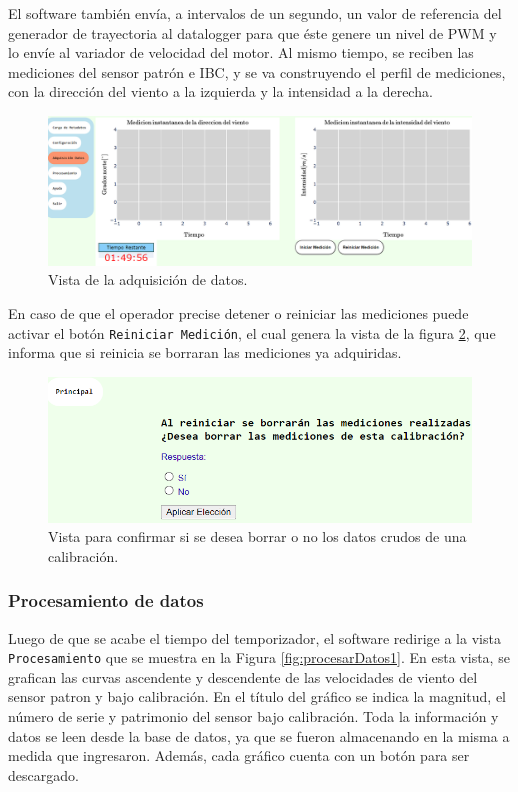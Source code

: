El software también envía, a intervalos de un segundo, un valor de referencia del generador de trayectoria al datalogger para que éste genere un nivel de PWM y lo envíe al variador de velocidad del motor. Al mismo tiempo, se reciben las mediciones del sensor patrón e IBC, y se va construyendo el perfil de mediciones, con la dirección del viento a la izquierda y la intensidad a la derecha.

\begin{figure}[H]
    \centering
    \includegraphics[width=1\linewidth]{Figuras/AplicacionWeb/frondend/adquisicionDatos.png}
    \caption{Vista de la adquisición de datos.}
    \label{fig:adquisicionDatos}
\end{figure}

En caso de que el operador precise detener o reiniciar las mediciones puede activar el botón \texttt{Reiniciar Medición}, el cual genera la vista de la figura \ref{fig:borrarMediciones}, que informa que si reinicia se borraran las mediciones ya adquiridas.

\begin{figure}[H]
    \centering
    \includegraphics[width=0.8\linewidth]{Figuras/AplicacionWeb/frondend/borrarMediciones.png}
    \caption{Vista para confirmar si se desea borrar o no los datos crudos de una calibración.}
    \label{fig:borrarMediciones}
\end{figure}



\subsubsection{Procesamiento de datos}\label{sec:ProcesamientoDatos}
Luego de que se acabe el tiempo del temporizador, el software redirige a la vista \texttt{Procesamiento} que se muestra en la Figura \ref{fig:procesarDatos1}. En esta vista, se grafican las curvas ascendente y descendente de las velocidades de viento del sensor patron y bajo calibración. En el título del gráfico se indica la magnitud, el número de serie y patrimonio del sensor bajo calibración. Toda la información y datos se leen desde la base de datos, ya que se fueron almacenando en la misma a medida que ingresaron. Además, cada gráfico cuenta con un botón para ser descargado.

